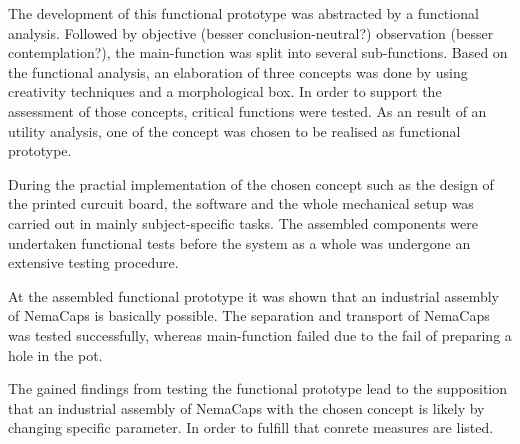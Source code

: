 The development of this functional prototype was abstracted by a functional analysis. Followed by objective (besser conclusion-neutral?) observation (besser contemplation?), the main-function was split into several sub-functions. Based on the functional analysis, an elaboration of three concepts was done by using creativity techniques and a morphological box. In order to support the assessment of those concepts, critical functions were tested. As an result of an utility analysis, one of the concept was chosen to be realised as functional prototype.
\newline

During the practial implementation of the chosen concept such as the design of the printed curcuit board, the software and the whole mechanical setup was carried out in mainly subject-specific tasks. The assembled components were undertaken functional tests before the system as a whole was undergone an extensive testing procedure.
\newline

At the assembled functional prototype it was shown that an industrial assembly of NemaCaps is basically possible. The separation and transport of NemaCaps was tested successfully, whereas main-function failed due to the fail of preparing a hole in the pot.
\newline

The gained findings from testing the functional prototype lead to the supposition that an industrial assembly of NemaCaps with the chosen concept is likely by changing specific parameter. In order to fulfill that conrete measures are listed.